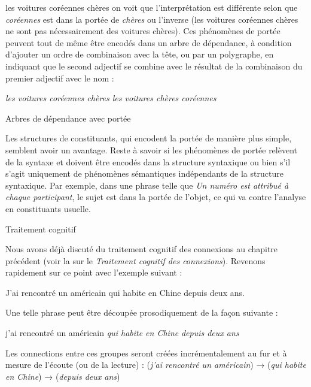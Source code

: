 {    \ea
    {les voitures coréennes chères}
    \z
{}
    \z
    on voit que l’interprétation est différente selon que \textit{coréennes} est dans la portée de \textit{chères} ou l’inverse (les voitures coréennes chères ne sont pas nécessairement des voitures chères). Ces phénomènes de portée peuvent tout de même être encodés dans un arbre de dépendance, à condition d’ajouter un ordre de combinaison avec la tête, ou par un polygraphe, en indiquant que le second adjectif se combine avec le résultat de la combinaison du premier adjectif avec le nom :

    \ea

    {\itshape
    les voitures coréennes chères              les voitures chères coréennes
    }

    Arbres de dépendance avec portée
    \z

    Les structures de constituants, qui encodent la portée de manière plus simple, semblent avoir un avantage. Reste à savoir si les phénomènes de portée relèvent de la syntaxe et doivent être encodés dans la structure syntaxique ou bien s’il s’agit uniquement de phénomènes sémantiques indépendants de la structure syntaxique. Par exemple, dans une phrase telle que \textit{Un numéro est attribué à chaque participant}, le sujet est dans la portée de l’objet, ce qui va contre l’analyse en constituants usuelle.

    \ea
    Traitement cognitif
    \z

    Nous avons déjà discuté du traitement cognitif des connexions au chapitre précédent (voir la  sur le \textit{Traitement cognitif des connexions}). Revenons rapidement sur ce point avec l’exemple suivant :

    \ea
    {J’ai rencontré un américain qui habite en Chine depuis deux ans.}
    \z

    Une telle phrase peut être découpée prosodiquement de la façon suivante :

    \ea
    {j’ai rencontré un américain} {\textbar} \textit{qui habite en Chine} {\textbar} \textit{depuis deux ans}
    \z

    Les connections entre ces groupes seront créées incrémentalement au fur et à mesure de l’écoute (ou de la lecture) :
    \ea
    (\textit{j’ai rencontré un américain}) \textrm{→} (\textit{qui habite en Chine}) \textrm{→} (\textit{depuis deux ans})
    \z

}
